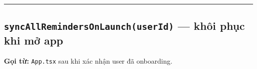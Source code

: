 \documentclass[12pt,a4paper]{article}
\newenvironment{Shaded}{%
  \VerbatimEnvironment
  \begin{quote}\small\ttfamily
}{%
  \end{quote}%
}
\begin{document}
\begin{Shaded}
\begin{Highlighting}[]
 \NormalTok{()}\OperatorTok{;}           
\OperatorTok{,}\OperatorTok{=} \OperatorTok{;}  
\OperatorTok{=} \NormalTok{(\{}
\OperatorTok{:}\OperatorTok{:} \OperatorTok{,}\OperatorTok{:} \OperatorTok{,}\OperatorTok{:} \NormalTok{ \}}\OperatorTok{,}
\OperatorTok{:}\OperatorTok{:}\OperatorTok{,}\OperatorTok{,}\OperatorTok{,}\OperatorTok{:} \NormalTok{ \}}\OperatorTok{,}  
\NormalTok{\})}\OperatorTok{;}
\OperatorTok{,}\OperatorTok{;}  

\end{Highlighting}
\end{Shaded}

\begin{center}\rule{0.5\linewidth}{0.5pt}\end{center}

\subsection{\texorpdfstring{\texttt{syncAllRemindersOnLaunch(userId)}
--- khôi phục khi mở
app}{syncAllRemindersOnLaunch(userId) --- khôi phục khi mở app}}\label{syncallremindersonlaunchuserid-khuxf4i-phux1ee5c-khi-mux1edf-app}

\textbf{Gọi từ:} \texttt{App.tsx} sau khi xác nhận user đã onboarding.
\end{document}
